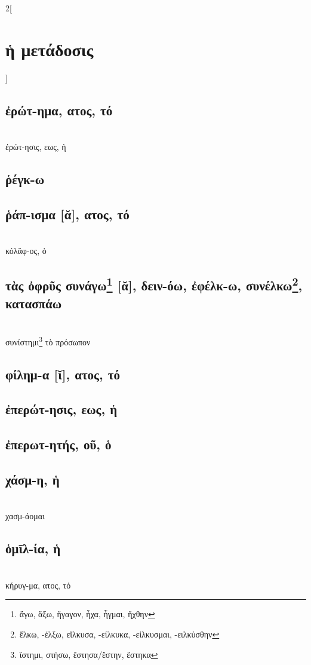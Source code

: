 \documentclass{book}
\begin{document}
\begin{multicols}{2}[\section{ἡ μετάδοσις}]
\subsection{ἐρώτ-ημα, ατος, τό}  ~\\
ἐρώτ-ησις, εως, ἡ
\subsection{ῥέγκ-ω}
\subsection{ῥάπ-ισμα [ᾰ], ατος, τό}  ~\\
κόλᾰφ-ος, ὁ 
\subsection{τὰς ὀφρῦς συνάγω\protect\footnote{ἄγω, ἄξω, ἤγαγον, ἦχα, ἦγμαι, ἤχθην} [ᾰ], δειν-όω, ἐφέλκ-ω, συνέλκω\protect\footnote{ἕλκω, -έλξω, εἵλκυσα, -είλκυκα, -είλκυσμαι, -ειλκύσθην}, κατασπάω} 
 ~\\
{συνίστημι\footnote{ἵστημι, στήσω, ἔστησα/ἔστην, ἕστηκα} τὸ πρόσωπον}
\subsection{φίλημ-α [ῐ], ατος, τό}
\subsection{ἐπερώτ-ησις, εως, ἡ}
\subsection{ἐπερωτ-ητής, οῦ, ὁ}
\subsection{χάσμ-η, ἡ}  ~\\
χασμ-άομαι 
\subsection{ὁμῑλ-ία, ἡ}
 ~\\
κήρυγ-μα, ατος, τό
~
\end{multicols}
\end{document}
